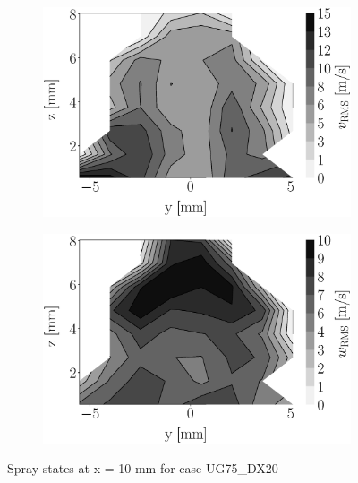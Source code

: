 \begin{figure}[h!]
\begin{subfigure}[b]{0.22\textwidth}
   \includegraphics[scale=0.17]{./part2_developments/figures_ch5_resolved_JICF/injectors_SLI/uG75_dx20_x10_uy_rms_map.eps}
\end{subfigure}
   \hspace{0.17in}
\begin{subfigure}[b]{0.22\textwidth}
	\centering
   \includegraphics[scale=0.17]{./part2_developments/figures_ch5_resolved_JICF/injectors_SLI/uG75_dx20_x10_uz_rms_map.eps}
\end{subfigure}
\caption{Spray states at x = 10 mm for case UG75\_DX20}
\label{fig:injectors_sli_uG75_dx20_x10}
\end{figure}




